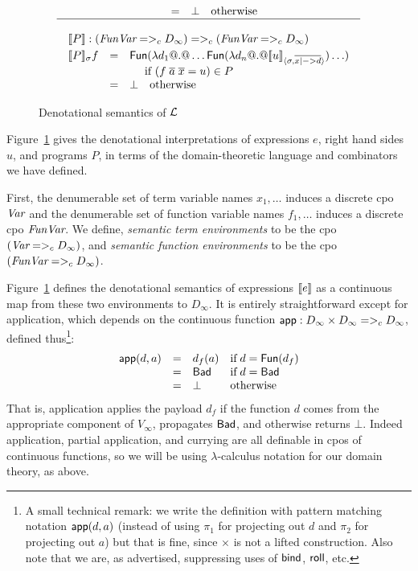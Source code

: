 \begin{figure}
$$\begin{array}{c}
\begin{array}{rcl}
          & = & \bot \quad \text{otherwise}
\end{array} \\
\hline \\
\begin{array}{rcl}
\multicolumn{3}{l}{\dbrace{P} : (\FVarCpo =>_c D_{\infty}) =>_c (\FVarCpo =>_c D_{\infty})}  \\[1mm]
\dbrace{P}_{\sigma} f & = & \roll{\ret{\injFun{\dlambda d_1 @.@ \ldots
       \roll{\ret{\injFun{\dlambda d_n @.@ \interp{u}{\sigma}{\ol{x |-> d}}}}}\ldots}}} \\
 && \quad \text{ if } (f\;\ol{a}\;\ol{x} = u) \in P \\
          & = & \bot \quad \text{otherwise}
\end{array}
\end{array}
$$
\caption{Denotational semantics of $\cal L$} \label{f:denot}
\end{figure}

Figure~\ref{f:denot} gives the denotational interpretations 
of expressions $e$, right hand sides $u$, and programs $P$, in 
terms of the domain-theoretic language and combinators we have defined.

First, the denumerable set of term variable names $x_1,\ldots$ induces a discrete 
cpo $\textit{Var}$  and the denumerable set of function variable names $f_1,\ldots$ induces a discrete 
cpo $\textit{FunVar}$. We define, {\em semantic term environments} to be the cpo $(\textit{Var} =>_c D_{\infty})$, 
and {\em semantic function environments} to be the cpo $(\textit{FunVar} =>_c D_{\infty})$. 

Figure~\ref{f:denot} defines the denotational semantics of expressions
$[\![e]\!]$ as a continuous map from these two environments to $D_{\infty}$.
It is entirely straightforward except for application, which depends on
the continuous function $\mathsf{app} : D_\infty \times D_\infty =>_c D_\infty$, 
defined thus\footnote{
A small technical remark: we write
the definition with pattern matching notation
$\mathsf{app}(d,a)$ (instead of using $\pi_1$ for projecting
out $d$ and $\pi_2$ for projecting out $a$) but that is fine,
since $\times$ is not a lifted construction.
Also note that we are, as advertised, suppressing uses
of $\mathsf{bind}$, $\mathsf{roll}$, etc.
}: 
{\setlength{\arraycolsep}{2pt}
\[\begin{array}{rcll}
  \mathsf{app}(d,a) & = & d_f(a)    & \mbox{if}\; d = \mathsf{Fun}(d_f) \\
             & = & \mathsf{Bad} & \mbox{if}\; d = \mathsf{Bad} \\
             & = & \bot    & \mbox{otherwise} 
\end{array}\]}%
That is, application applies the payload $d_f$ 
if the function $d$ comes
from the appropriate component of $V_{\infty}$, propagates $\mathsf{Bad}$,
and otherwise returns $\bot$.  Indeed application, partial
application, and currying are all definable in cpos of continuous
functions, so we will be using $\lambda$-calculus notation for our
domain theory, as above.

